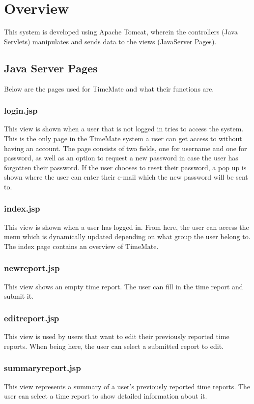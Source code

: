 \documentclass{article}
\begin{document}
\section{Overview}
This system is developed using Apache Tomcat, wherein the controllers (Java Servlets) manipulates and sends data to the views (JavaServer Pages).

\subsection{Java Server Pages}
Below are the pages used for TimeMate and what their functions are.

\subsubsection{login.jsp}
This view is shown when a user that is not logged in tries to access the system. This is the only page in the TimeMate system a user can get access to without having an account. The page consists of two fields,  one for username and one for password, as well as an option to request a new password in case the user has forgotten their password.  If the user chooses to reset their password, a pop up is shown where the user can enter their e-mail which the new password will be sent to.

\subsubsection{index.jsp}
This view is shown when a user has logged in. From here,  the user can access the menu which is dynamically updated depending on what group the user belong to. The index page contains an overview of TimeMate.

\subsubsection{newreport.jsp}
This view shows an empty time report. The user can fill in the time report and submit it.

\subsubsection{editreport.jsp}
This view is used by users that want to edit their previously reported time reports. When being here, the user can select a submitted report to edit.

\subsubsection{summaryreport.jsp}
This view represents a summary of a user's previously reported time reports. The user can select a time report to show detailed information about it.
\end{document}
